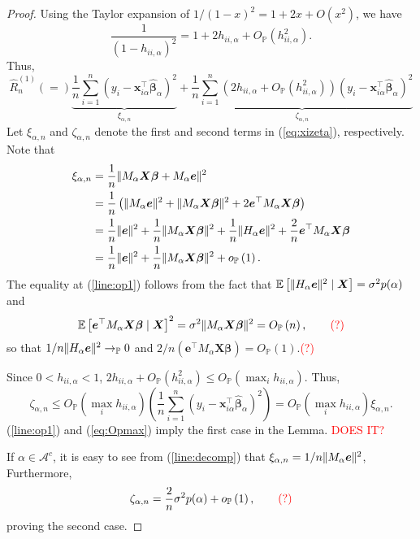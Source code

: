\documentclass[12pt, letter paper]{article}
\newcommand{\1}{\mathmybb{1}}
\newcommand{\0}{\emptyset}
\newcommand{\prob}{\mathbb{P}}
\newcommand{\Ep}[1]{\mathbb{E}\left[ #1 \right]}
\newcommand{\paren}[1]{\left(#1 \right)}
\newcommand{\norm}[1]{|\hspace{-1pt}|#1 |\hspace{-1pt}|}
\newcommand{\normsq}[1]{\norm{#1}^{2}}
\newcommand{\Acal}{\mathcal{A}}
\newcommand{\X}{\boldsymbol{X}}
\newcommand{\x}{\boldsymbol{x}}
\newcommand{\e}{\boldsymbol{e}}
\newcommand{\bbeta}{\boldsymbol{\beta}}
\newcommand{\bbetahat}{\boldsymbol{\hat{\beta}}}
\newcommand{\lev}{h_{ii,\alpha}}
\newcommand{\loocv}[1]{\hat{R}^{(1)}_{n}\paren{#1}}
\newcommand{\op}[1]{o_{\prob}\paren{#1}}
\newcommand{\Op}[1]{O_{\prob}\paren{#1}}
\begin{document}
\begin{proof}
    Using the Taylor expansion of \(1/{(1-x)}^{2} = 1+2x + O(x^{2})\), we have
    \[\frac{1}{\paren{1-\lev}^{2}} = 1 + 2\lev + \Op{\lev^{2}}.\]
    Thus,
    \begin{equation}
        \label{eq:xizeta}
        \loocv = \underbrace{\frac{1}{n}\sum_{i=1}^{n}\paren{y_{i}-\x_{i\alpha}^{\top}\bbetahat_{\alpha}}^{2}}_{\xi_{\alpha,n}} + \underbrace{\frac{1}{n}\sum_{i=1}^{n}\paren{2\lev + \Op{\lev^{2}}}\paren{y_{i}-\x_{i\alpha}^{\top}\bbetahat_{\alpha}}^{2}}_{\zeta_{\alpha,n}}
    \end{equation}
    Let \(\xi_{\alpha,n}\) and \(\zeta_{\alpha,n}\) denote the first and second terms in (\ref{eq:xizeta}), respectively. Note that
    \begin{align}
        \notag\xi_{\alpha,n} &= \frac{1}{n}\normsq{M_{\alpha}\X\bbeta + M_{\alpha}\e}\\
        \label{line:decomp}&= \frac{1}{n}\paren{\normsq{M_{\alpha}\e} + \normsq{M_{\alpha}\X\bbeta} + 2 \e^{\top}M_{\alpha}\X\bbeta}\\
        \notag&=\frac{1}{n}\normsq{\e} + \frac{1}{n}\normsq{M_{\alpha}\X\bbeta} + \frac{1}{n}\normsq{H_{\alpha}\e} + \frac{2}{n}\e^{\top}M_{\alpha}\X\bbeta\\
        \label{line:op1}&= \frac{1}{n}\normsq{\e} + \frac{1}{n}\normsq{M_{\alpha}\X\bbeta} + \op{1}.
    \end{align}
    The equality at (\ref{line:op1}) follows from the fact that \(\Ep{\normsq{H_{\alpha}\e}\mid\X} = \sigma^{2}p(\alpha)\) and 
    \[\Ep{\e^{\top}M_{\alpha}\X\bbeta\mid\X}^{2} = \sigma^{2}\normsq{M_{\alpha}\X\bbeta} = \Op{n},\qquad\textcolor{red}{(?)}\]
    so that \(1/n\normsq{H_{\alpha}\e}\to_{\prob}0\) and \(2/n\paren{\e^{\top}M_{\alpha}\X\bbeta}=\Op{1}\).\quad\textcolor{red}{(?)} %

    Since \(0<\lev<1\), \(2\lev + \Op{\lev^{2}}\leq\Op{\max_{i}\lev}\). Thus,
    \begin{equation}
        \label{eq:Opmax}
        \zeta_{\alpha,n}\leq\Op{\max_{i}\lev}\paren{\frac{1}{n}\sum_{i=1}^{n}\paren{y_{i} - \x_{i\alpha}^{\top}\bbetahat_{\alpha}}^{2}} = \Op{\max_{i}\lev}\xi_{\alpha,n}.
    \end{equation}
    (\ref{line:op1}) and (\ref{eq:Opmax}) imply the first case in the Lemma.\textcolor{red}{ DOES IT?}

    If \(\alpha\in\Acal^{c}\), it is easy to see from (\ref{line:decomp}) that \(\xi_{\alpha,n} = 1/n\normsq{M_{\alpha}\e}\), Furthermore,
    \[\zeta_{\alpha,n} = \frac{2}{n}\sigma^{2}p(\alpha) + \op{1},\qquad\textcolor{red}{(?)}\]
    proving the second case.
\end{proof}
\end{document}
